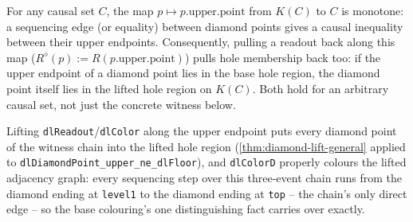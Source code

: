 \begin{theorem}\label{thm:diamond-lift-general}\leanok{}
For any causal set $C$, the map $p \mapsto p.\text{upper}.\text{point}$ from $K(C)$ to $C$ is
monotone: a sequencing edge (or equality) between diamond points gives a causal inequality between
their upper endpoints. Consequently, pulling a readout back along this map
($R^\diamond(p) := R(p.\text{upper}.\text{point})$) pulls hole membership back too: if the upper
endpoint of a diamond point lies in the base hole region, the diamond point itself lies in the
lifted hole region on $K(C)$. Both hold for an arbitrary causal set, not just the concrete witness
below.
\end{theorem}

\begin{theorem}\label{thm:diamond-lift-coloring}\leanok{}
Lifting \texttt{dlReadout}/\texttt{dlColor} along the upper endpoint puts every diamond point of
the witness chain into the lifted hole region (\cref{thm:diamond-lift-general} applied to
\texttt{dlDiamondPoint\_upper\_ne\_dlFloor}), and \texttt{dlColorD} properly colours the lifted
adjacency graph: every sequencing step over this three-event chain runs from the diamond ending at
\texttt{level1} to the diamond ending at \texttt{top} -- the chain's only direct edge -- so the
base colouring's one distinguishing fact carries over exactly.
\end{theorem}

